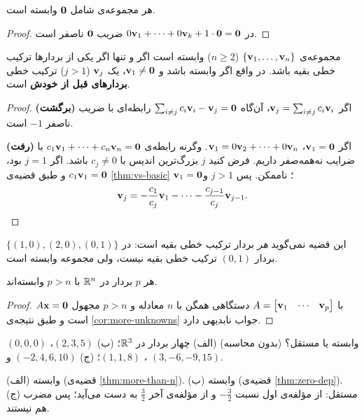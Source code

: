 \begin{theorem}\label{thm:zero-dep}
هر مجموعه‌ی شامل $\mathbf{0}$ وابسته است.
\end{theorem}
\begin{proof}
در $0\mathbf{v}_1+\dots+0\mathbf{v}_k+1\cdot\mathbf{0}=\mathbf{0}$ ضریب $\mathbf{0}$ ناصفر است.
\end{proof}

\begin{theorem}\label{thm:dep-char}
مجموعه‌ی $\{\mathbf{v}_1,\dots,\mathbf{v}_n\}$ ($n\ge2$) وابسته است اگر و تنها اگر یکی از بردارها ترکیب خطی بقیه باشد. در واقع اگر وابسته باشد و $\mathbf{v}_1\neq\mathbf{0}$، یک $\mathbf{v}_j$ ($j>1$) ترکیب خطی \textbf{بردارهای قبل از خودش} است.
\end{theorem}
\begin{proof}
\textbf{(برگشت)} اگر $\mathbf{v}_j=\sum_{i\neq j}c_i\mathbf{v}_i$، آن‌گاه $\sum_{i\neq j}c_i\mathbf{v}_i-\mathbf{v}_j=\mathbf{0}$ رابطه‌ای با ضریب ناصفر $-1$ است.

\textbf{(رفت)} اگر $\mathbf{v}_1=\mathbf{0}$، $\mathbf{v}_1=0\mathbf{v}_2+\dots+0\mathbf{v}_n$. وگرنه رابطه‌ی $c_1\mathbf{v}_1+\dots+c_n\mathbf{v}_n=\mathbf{0}$ با ضرایب نه‌همه‌صفر داریم. فرض کنید $j$ بزرگ‌ترین اندیس با $c_j\neq0$ باشد. اگر $j=1$ بود، $c_1\mathbf{v}_1=\mathbf{0}$ و طبق قضیه‌ی \ref{thm:vs-basic} $\mathbf{v}_1=\mathbf{0}$؛ ناممکن. پس $j>1$ و
\[
\mathbf{v}_j=-\frac{c_1}{c_j}\mathbf{v}_1-\dots-\frac{c_{j-1}}{c_j}\mathbf{v}_{j-1}.
\]
\end{proof}

\begin{warning}
این قضیه نمی‌گوید \emph{هر} بردار ترکیب خطی بقیه است: در $\{(1,0),(2,0),(0,1)\}$ بردار $(0,1)$ ترکیب خطی بقیه نیست، ولی مجموعه وابسته است.
\end{warning}

\begin{theorem}\label{thm:more-than-n}
هر $p$ بردار در $\mathbb{R}^n$ با $p>n$ وابسته‌اند.
\end{theorem}
\begin{proof}
$A\mathbf{x}=\mathbf{0}$ با $A=\begin{bmatrix}\mathbf{v}_1&\cdots&\mathbf{v}_p\end{bmatrix}$ دستگاهی همگن  با $n$ معادله و $p>n$ مجهول است و طبق نتیجه‌ی \ref{cor:more-unknowns} جواب نابدیهی دارد.
\end{proof}

\begin{example}
وابسته یا مستقل؟ (بدون محاسبه)
(الف) چهار بردار در $\mathbb{R}^3$؛
(ب) $(2,3,5)$، $(0,0,0)$، $(1,1,8)$؛
(ج) $(-2,4,6,10)$ و $(3,-6,-9,15)$.
\end{example}
\begin{solution}
(الف) وابسته (قضیه‌ی \ref{thm:more-than-n}). (ب) وابسته (قضیه‌ی \ref{thm:zero-dep}). (ج) مستقل: از مؤلفه‌ی اول نسبت $-\frac32$ و از مؤلفه‌ی آخر $\frac32$ به دست می‌آید؛ پس مضرب هم نیستند.
\end{solution}

